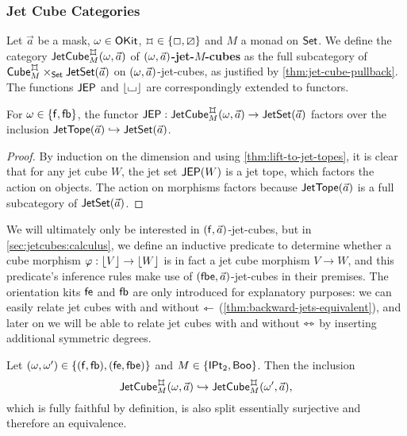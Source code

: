 \documentclass[a4paper]{memoir}
\begin{document}
\subsubsection{Jet Cube Categories}
\begin{definition} \label{def:jet-cube-cat}
	Let $\vec a$ be a mask, $\omega \in {\mathsf{OKit}}$, $\mycubex \in \accol{\affine, \cartes}$ and $M$ a monad on ${\mathsf{Set}}$.
	We define
	the category $\jetcube{\myorix}{\mycubex}{M}{\vec a}$ of \textbf{$(\omega, \vec a)$-jet-$M$-cubes}
	as the full subcategory of $\cubecat^\mycubex_M \times_\Set \jetset{\vec a}$ on $(\omega, \vec a)$-jet-cubes, as justified by \cref{thm:jet-cube-pullback}.
	The functions $\mathsf{JEP}$ and $\mathopen{}\left\lfloor {\llcorner\hspace{-.4ex}\lrcorner} \right\rfloor\mathclose{}$ are correspondingly extended to functors.
\end{definition}
\begin{corollary} \label{thm:jet-cubes-are-topes}
	For $\omega \in \mathopen{}\left\{ {\mathsf{f}}, {\mathsf{fb}} \right\}\mathclose{}$, the functor $\JEP : \jetcube{\myorix}{\mycubex}{M}{\vec a} \to \jetset{\vec a}$ factors over the inclusion $\mathsf{JetTope}(\vec a) \hookrightarrow \mathsf{JetSet}(\vec a)$.
\end{corollary}
\begin{proof}
	By induction on the dimension and using \cref{thm:lift-to-jet-topes}, it is clear that for any jet cube $W$, the jet set $\mathsf{JEP}(W)$ is a jet tope, which factors the action on objects. The action on morphisms factors because $\mathsf{JetTope}(\vec a)$ is a full subcategory of $\mathsf{JetSet}(\vec a)$.
\end{proof}
We will ultimately only be interested in $({\mathsf{f}}, \vec a)$-jet-cubes, but in \cref{sec:jetcubes:calculus}, we define an inductive predicate to determine whether a cube morphism $\varphi : \mathopen{}\left\lfloor V \right\rfloor\mathclose{} \to \mathopen{}\left\lfloor W \right\rfloor\mathclose{}$ is in fact a jet cube morphism $V \to W$, and this predicate's inference rules make use of $({\mathsf{fbe}}, \vec a)$-jet-cubes in their premises.
The orientation kits ${\mathsf{fe}}$ and ${\mathsf{fb}}$ are only introduced for explanatory purposes: we can easily relate jet cubes with and without $\leftarrowtriangle$ (\cref{thm:backward-jets-equivalent}), and later on we will be able to relate jet cubes with and without $\leftrightarrowtriangle$ by inserting additional symmetric degrees.
\begin{proposition} \label{thm:backward-jets-equivalent}
	Let $(\omega, \omega') \in \mathopen{}\left\{ ({\mathsf{f}}, {\mathsf{fb}}), ({\mathsf{fe}}, {\mathsf{fbe}}) \right\}\mathclose{}$ and $M \in \mathopen{}\left\{ {\mathsf{IPt}_2}, \mathsf{Boo} \right\}\mathclose{}$.
	Then the inclusion
	\[
		\jetcube{\myorix}{\mycubex}{M}{\vec a} \hookrightarrow \jetcube{\myorix'}{\mycubex}{M}{\vec a},
	\]
	which is fully faithful by definition, is also split essentially surjective and therefore an equivalence.
\end{proposition}
\end{document}
